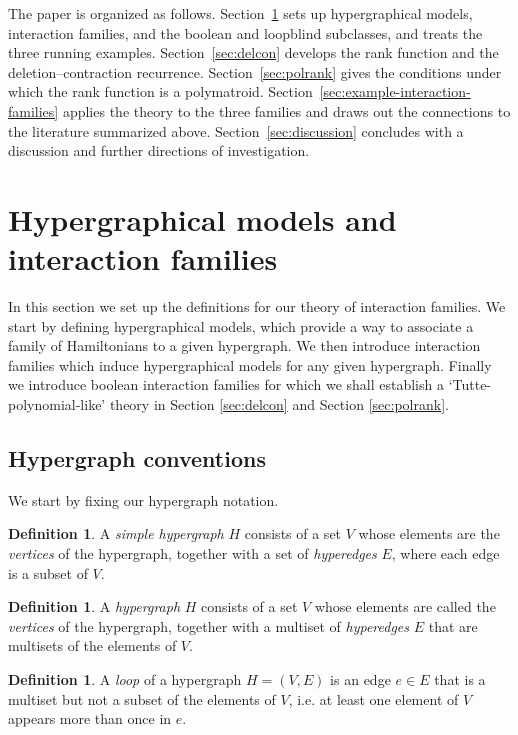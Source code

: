 \documentclass[11pt,reqno]{amsart}
\theoremstyle{plain}
\theoremstyle{definition}
\newtheorem{definition}[theorem]{Definition}
\numberwithin{equation}{section}
\begin{document}
The paper is organized as follows. Section~\ref{sec:mcdef} sets up hypergraphical models, interaction families, and the boolean and loopblind subclasses, and treats the three running examples. Section~\ref{sec:delcon} develops the rank function and the deletion--contraction recurrence. Section~\ref{sec:polrank} gives the conditions under which the rank function is a polymatroid. Section~\ref{sec:example-interaction-families} applies the theory to the three families and draws out the connections to the literature summarized above. Section~\ref{sec:discussion} concludes with a discussion and further directions of investigation.

\section{Hypergraphical models and interaction families}
\label{sec:mcdef}
In this section we set up the definitions for our theory of interaction families. We start by defining hypergraphical models, which provide a way to associate a family of Hamiltonians to a given hypergraph. We then introduce interaction families which induce hypergraphical models for any given hypergraph. Finally we introduce boolean interaction families for which we shall establish a `Tutte-polynomial-like' theory in Section \ref{sec:delcon} and Section \ref{sec:polrank}.

\subsection{Hypergraph conventions}
We start by fixing our hypergraph notation.
\begin{definition}  \label{simplehypergraph}
A \emph{simple hypergraph}   $H$ consists of a set $V$ whose elements are the \emph{vertices} of the hypergraph, together with a set of \emph{hyperedges} $E$, where each edge is a subset of $V$.
\end{definition} 

\begin{definition} \label{hypergraph}
 A \emph{hypergraph}   $H$ consists of a set $V$ whose elements are called the \emph{vertices} of the hypergraph, together with a multiset of \emph{hyperedges} $E$ that are  multisets of the elements of $V$.  
\end{definition}

\begin{definition}
    A \emph{loop} of a hypergraph $H = (V,E)$ is an edge $e\in E$ that is a multiset but not a subset of the elements of $V$, i.e. at least one element of $V$ appears more than once in $e$.
\end{definition}
\end{document}

